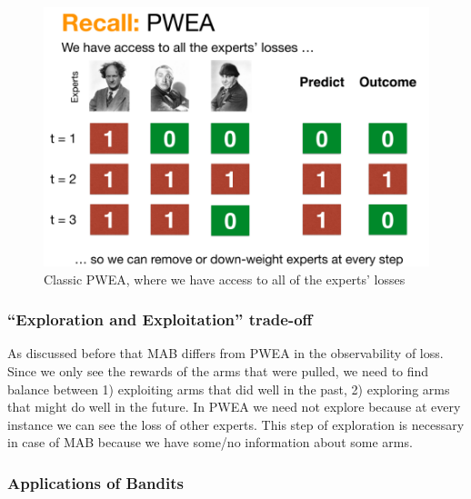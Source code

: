 \documentclass[11pt]{article}
\begin{document}
\begin{figure}
    \centering
    \includegraphics[width=0.75\linewidth]{images/PWEA_recall.png}
    \caption{Classic PWEA, where we have access to all of the experts' losses }
    \label{fig:PWEA}
\end{figure}

\subsubsection{“Exploration and Exploitation” trade-off}

As discussed before that MAB differs from PWEA in the observability of loss. Since we only see the rewards of the arms that were pulled, we need to find balance between 1) exploiting arms that did well in the past, 2) exploring arms that might do well in the future. In PWEA we need not explore because at every instance we can see the loss of other experts. This step of exploration is necessary in case of MAB because we have some/no information about some arms.   
\subsubsection{Applications of Bandits}
\end{document}
